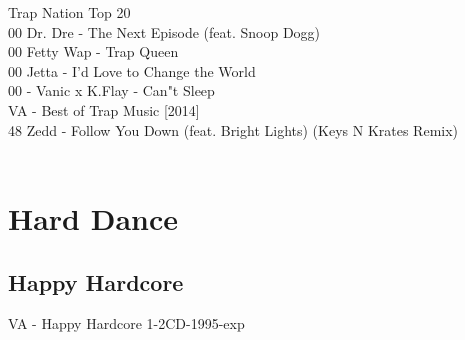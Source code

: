 \begin{multicols}{2}
 \large Trap Nation Top 20 \normalsize\\
 00 Dr. Dre - The Next Episode (feat. Snoop Dogg)\\ 00 Fetty Wap - Trap Queen\\ 00 Jetta - I'd Love to Change the World\\ 00  - Vanic x K.Flay - Can"t Sleep\\
 \large VA - Best of Trap Music [2014] \normalsize\\
 48 Zedd - Follow You Down (feat. Bright Lights) (Keys N Krates Remix)\\
\\
\section*{Hard Dance}
 \subsection*{Happy Hardcore}
 \large VA - Happy Hardcore 1-2CD-1995-exp \normalsize\\

\end{multicols}
